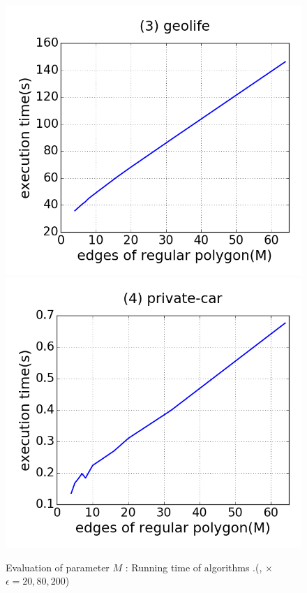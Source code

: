 {\begin{figure}[tb!]
\includegraphics[scale = 0.25]{figures/Exp-M-time-geolife.png}
\includegraphics[scale = 0.25]{figures/Exp-M-time-private.png}
\vspace{-2ex}
\caption{\small Evaluation of parameter $M$ : Running time of algorithms \cista.(\rpia, \cpia $\times$ $\epsilon = 20, 80, 200$)}
\label{fig:m-time-cista}
\vspace{-1ex}
\end{figure}
}




